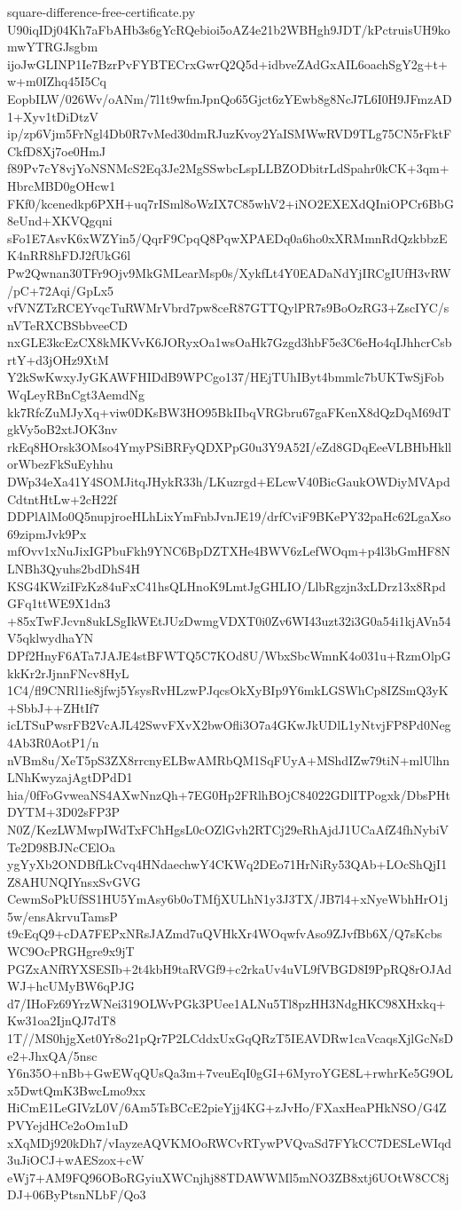 \documentclass[11pt]{article}
\theoremstyle{definition}
\theoremstyle{remark}
\begin{document}
\begin{filecontents*}[overwrite]{square-difference-free-certificate.py}
U90iqIDj04Kh7aFbAHb3s6gYcRQebioi5oAZ4e21b2WBHgh9JDT/kPctruisUH9komwYTRGJsgbm
ijoJwGLINP1Ie7BzrPvFYBTECrxGwrQ2Q5d+idbveZAdGxAIL6oachSgY2g+t+w+m0IZhq45I5Cq
EopbILW/026Wv/oANm/7l1t9wfmJpnQo65Gjct6zYEwb8g8NcJ7L6I0H9JFmzAD1+Xyv1tDiDtzV
ip/zp6Vjm5FrNgl4Db0R7vMed30dmRJuzKvoy2YaISMWwRVD9TLg75CN5rFktFCkfD8Xj7oe0HmJ
f89Pv7cY8vjYoNSNMcS2Eq3Je2MgSSwbcLspLLBZODbitrLdSpahr0kCK+3qm+HbrcMBD0gOHcw1
FKf0/kcenedkp6PXH+uq7rISml8oWzIX7C85whV2+iNO2EXEXdQIniOPCr6BbG8eUnd+XKVQgqni
sFo1E7AsvK6xWZYin5/QqrF9CpqQ8PqwXPAEDq0a6ho0xXRMmnRdQzkbbzEK4nRR8hFDJ2fUkG6l
Pw2Qwnan30TFr9Ojv9MkGMLearMsp0s/XykfLt4Y0EADaNdYjIRCgIUfH3vRW/pC+72Aqi/GpLx5
vfVNZTzRCEYvqcTuRWMrVbrd7pw8ceR87GTTQylPR7s9BoOzRG3+ZscIYC/snVTeRXCBSbbveeCD
nxGLE3kcEzCX8kMKVvK6JORyxOa1wsOaHk7Gzgd3hbF5e3C6eHo4qIJhhcrCsbrtY+d3jOHz9XtM
Y2kSwKwxyJyGKAWFHIDdB9WPCgo137/HEjTUhIByt4bmmlc7bUKTwSjFobWqLeyRBnCgt3AemdNg
kk7RfcZuMJyXq+viw0DKsBW3HO95BkIIbqVRGbru67gaFKenX8dQzDqM69dTgkVy5oB2xtJOK3nv
rkEq8HOrsk3OMso4YmyPSiBRFyQDXPpG0u3Y9A52I/eZd8GDqEeeVLBHbHkllorWbezFkSuEyhhu
DWp34eXa41Y4SOMJitqJHykR33h/LKuzrgd+ELcwV40BicGaukOWDiyMVApdCdtntHtLw+2cH22f
DDPlAlMo0Q5nupjroeHLhLixYmFnbJvnJE19/drfCviF9BKePY32paHc62LgaXso69zipmJvk9Px
mfOvv1xNuJixIGPbuFkh9YNC6BpDZTXHe4BWV6zLefWOqm+p4l3bGmHF8NLNBh3Qyuhs2bdDhS4H
KSG4KWziIFzKz84uFxC41hsQLHnoK9LmtJgGHLIO/LlbRgzjn3xLDrz13x8RpdGFq1ttWE9X1dn3
+85xTwFJcvn8ukLSgIkWEtJUzDwmgVDXT0i0Zv6WI43uzt32i3G0a54i1kjAVn54V5qklwydhaYN
DPf2HnyF6ATa7JAJE4stBFWTQ5C7KOd8U/WbxSbcWmnK4o031u+RzmOlpGkkKr2rJjnnFNcv8HyL
1C4/fl9CNRl1ie8jfwj5YsysRvHLzwPJqcsOkXyBIp9Y6mkLGSWhCp8IZSmQ3yK+SbbJ++ZHtIf7
icLTSuPwsrFB2VcAJL42SwvFXvX2bwOfli3O7a4GKwJkUDlL1yNtvjFP8Pd0Neg4Ab3R0AotP1/n
nVBm8u/XeT5pS3ZX8rrcnyELBwAMRbQM1SqFUyA+MShdIZw79tiN+mlUlhnLNhKwyzajAgtDPdD1
hia/0fFoGvweaNS4AXwNnzQh+7EG0Hp2FRlhBOjC84022GDlITPogxk/DbsPHtDYTM+3D02sFP3P
N0Z/KezLWMwpIWdTxFChHgsL0cOZlGvh2RTCj29eRhAjdJ1UCaAfZ4fhNybiVTe2D98BJNcCElOa
ygYyXb2ONDBfLkCvq4HNdaechwY4CKWq2DEo71HrNiRy53QAb+LOcShQjI1Z8AHUNQIYnsxSvGVG
CewmSoPkUfSS1HU5YmAsy6b0oTMfjXULhN1y3J3TX/JB7l4+xNyeWbhHrO1j5w/ensAkrvuTamsP
t9cEqQ9+cDA7FEPxNRsJAZmd7uQVHkXr4WOqwfvAso9ZJvfBb6X/Q7sKcbsWC9OcPRGHgre9x9jT
PGZxANfRYXSESIb+2t4kbH9taRVGf9+c2rkaUv4uVL9fVBGD8I9PpRQ8rOJAdWJ+hcUMyBW6qPJG
d7/IHoFz69YrzWNei319OLWvPGk3PUee1ALNu5Tl8pzHH3NdgHKC98XHxkq+Kw31oa2IjnQJ7dT8
1T//MS0hjgXet0Yr8o21pQr7P2LCddxUxGqQRzT5IEAVDRw1caVcaqsXjlGcNsDe2+JhxQA/5nsc
Y6n35O+nBb+GwEWqQUsQa3m+7veuEqI0gGI+6MyroYGE8L+rwhrKe5G9OLx5DwtQmK3BwcLmo9xx
HiCmE1LeGIVzL0V/6Am5TsBCcE2pieYjj4KG+zJvHo/FXaxHeaPHkNSO/G4ZPVYejdHCe2oOm1uD
xXqMDj920kDh7/vIayzeAQVKMOoRWCvRTywPVQvaSd7FYkCC7DESLeWIqd3uJiOCJ+wAESzox+cW
eWj7+AM9FQ96OBoRGyiuXWCnjhj88TDAWWMl5mNO3ZB8xtj6UOtW8CC8jDJ+06ByPtsnNLbF/Qo3

\end{filecontents*}
\end{document}
